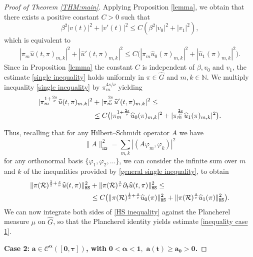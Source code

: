 \documentclass[12pt,oneside,a4paper]{book}
\numberwithin{equation}{section}     %
\theoremstyle{plain}
\theoremstyle{definition}
\newcommand{\N}{{\mathbb N}}
\newcommand{\HS}{{\mathtt{HS}}}
\begin{document}
\begin{proof}[Proof of Theorem \ref{THM:main}]
	Applying Proposition \ref{lemma}, we obtain that there exists a positive constant $C>0$  such that 
	\[
	\beta^2|v(t)|^2+|v'(t)|^2\leq C(\beta^2|v_0|^2+|v_1|^2),
	\]
	which is equivalent to
	\begin{align}\label{single inequality}
	|\pi_m\widehat u(t,\pi)_{m,k}|^2+|\widehat u'(t,\pi)_{m,k}|^2\leq C \big(|\pi_m\widehat u_0(\pi)_{m,k}|^2+|\widehat u_1(\pi)_{m,k}|^2\big).
	\end{align}
	Since in Proposition \ref{lemma} the constant $C$ is independent of $\beta,v_0$ and $v_1$, the estimate \eqref{single inequality} holds uniformly in $\pi\in\widehat G$ and $m, k\in\N$. We multiply inequality \eqref{single inequality} by $\pi_m^{4s/\nu}$ yielding
	\begin{align}
	|\pi_m^{1+\frac{2s}{\nu}}\widehat u(t,\pi)_{m,k}|^2&+|\pi_m^{\frac{2s}{\nu}}\widehat u'(t,\pi)_{m,k}|^2\leq\notag\\ 
	&\leq C \big(|\pi_m^{1+\frac{2s}{\nu}}\widehat u_0(\pi)_{m,k}|^2+|\pi_m^{\frac{2s}{\nu}}\widehat u_1(\pi)_{m,k}|^2\big).\label{general single inequality}
	\end{align}
	
	Thus, recalling that for any Hilbert--Schmidt operator $A$ we have 
	$$\|A\|^2_{\HS}=\sum_{m,k}|(A\varphi_m,\varphi_k)|^2$$ for any orthonormal basis $\{\varphi_1,\varphi_2,\dots\}$, we can consider the infinite sum over $m$ and $k$ of the inequalities provided by \eqref{general single inequality}, to obtain
	\begin{align}\label{HS inequality}
	\|\pi(\mathcal R)^{\frac{1}{2}+\frac{s}{\nu}}\widehat u (t,\pi)\|_{\HS}^2&+\|\pi(\mathcal R)^{\frac{s}{\nu}}\partial_t \widehat u(t,\pi)\|_{\HS}^2\leq\\\notag
	&\leq C\big(\|\pi(\mathcal R)^{\frac{1}{2}+\frac{s}{\nu}}\widehat u_0(\pi)\|_{\HS}^2+\|\pi(\mathcal R)^{\frac{s}{\nu}}\widehat u_1(\pi)\|_{\HS}^2\big).
	\end{align}
	We can now integrate both sides of \eqref{HS inequality} against the Plancherel measure $\mu$ on $\widehat G$, so that the Plancherel identity yields estimate \eqref{inequality case 1}.
	
	\medskip
	\textbf{Case 2:} $\bm{a\in\mathcal C^\alpha([0,\tau])}$\textbf{, with } $\bm{ 0<\alpha<1,\,\,a(t)\geq a_0>0}$\textbf{.}
	

\end{proof}
\end{document}
